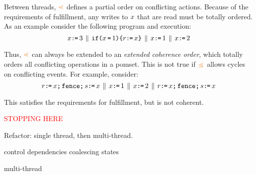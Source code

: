 Between threads, $\geN$ defines a partial order on conflicting actions.
Because of the requirements of fulfillment, any writes to $x$ that are
read must be totally ordered.  As an example consider the following program
and execution:
\[
  x\texttt{:}\mkern-1mu\texttt{=}\, 3
  \,\mathbin{\|}\,
  \texttt{if}\allowbreak\texttt{(}x\,\texttt{=}\,1\texttt{)}\allowbreak\texttt{\{} r\texttt{:}\mkern-1mu\texttt{=}\, x \texttt{\}}
  \,\mathbin{\|}\,
  x\texttt{:}\mkern-1mu\texttt{=}\, 1
  \,\mathbin{\|}\,
  x\texttt{:}\mkern-1mu\texttt{=}\,2
\]
\begin{tikzdisplay}[node distance=1em]
\end{tikzdisplay}
Thus, $\geN$ can always be extended to an
\emph{extended coherence order}, which totally orders all conflicting
operations in a pomset.  This is not true if $\gtN$ allows cycles on
conflicting events.  For example, consider:
\[
  r\texttt{:}\mkern-1mu\texttt{=}\, x \texttt{;}\,\texttt{fence}\texttt{;}\, s\texttt{:}\mkern-1mu\texttt{=}\, x
  \,\mathbin{\|}\,
  x\texttt{:}\mkern-1mu\texttt{=}\, 1
  \,\mathbin{\|}\,
  x\texttt{:}\mkern-1mu\texttt{=}\,2
  \,\mathbin{\|}\,
  r\texttt{:}\mkern-1mu\texttt{=}\, x \texttt{;}\,\texttt{fence}\texttt{;}\, s\texttt{:}\mkern-1mu\texttt{=}\, x
\]
\begin{tikzdisplay}[node distance=1em]
\end{tikzdisplay}
This satisfies the requirements for fulfillment, but is not coherent.



\textcolor{red}{STOPPING HERE}

Refactor: single thread, then multi-thread.

control dependencies coalescing states

multi-thread

